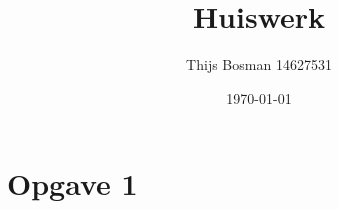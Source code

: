 \documentclass[a4paper]{article}
\title{Huiswerk}
\author{Thijs Bosman 14627531}
\date{\today}
\begin{document}
\maketitle

\section{Opgave 1}
\end{document}
